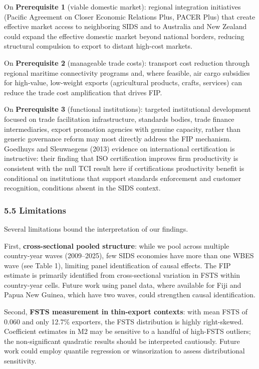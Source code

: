 \documentclass[12pt,a4paper]{article}
\begin{document}
On \textbf{Prerequisite 1} (viable domestic market): regional
integration initiatives (Pacific Agreement on Closer Economic Relations
Plus, PACER Plus) that create effective market access to neighboring
SIDS and to Australia and New Zealand could expand the effective
domestic market beyond national borders, reducing structural compulsion
to export to distant high-cost markets.

On \textbf{Prerequisite 2} (manageable trade costs): transport cost
reduction through regional maritime connectivity programs and, where
feasible, air cargo subsidies for high-value, low-weight exports
(agricultural products, crafts, services) can reduce the trade cost
amplification that drives FIP.

On \textbf{Prerequisite 3} (functional institutions): targeted
institutional development focused on trade facilitation infrastructure,
standards bodies, trade finance intermediaries, export promotion
agencies with genuine capacity, rather than generic governance reform
may most directly address the FIP mechanism. Goedhuys and
Sleuwaegen\textquotesingle s (2013) evidence on international
certification is instructive: their finding that ISO certification
improves firm productivity is consistent with the null TCI result here
if certification\textquotesingle s productivity benefit is conditional
on institutions that support standards enforcement and customer
recognition, conditions absent in the SIDS context.

\hypertarget{55-limitations}{%
\subsubsection{5.5 Limitations}\label{55-limitations}}

Several limitations bound the interpretation of our findings.

First, \textbf{cross-sectional pooled structure}: while we pool across
multiple country-year waves (2009--2025), few SIDS economies have more
than one WBES wave (see Table 1), limiting panel identification of
causal effects. The FIP estimate is primarily identified from
cross-sectional variation in FSTS within country-year cells. Future work
using panel data, where available for Fiji and Papua New Guinea, which
have two waves, could strengthen causal identification.

Second, \textbf{FSTS measurement in thin-export contexts}: with mean
FSTS of 0.060 and only 12.7\% exporters, the FSTS distribution is highly
right-skewed. Coefficient estimates in M2 may be sensitive to a handful
of high-FSTS outliers; the non-significant quadratic results should be
interpreted cautiously. Future work could employ quantile regression or
winsorization to assess distributional sensitivity.
\end{document}
